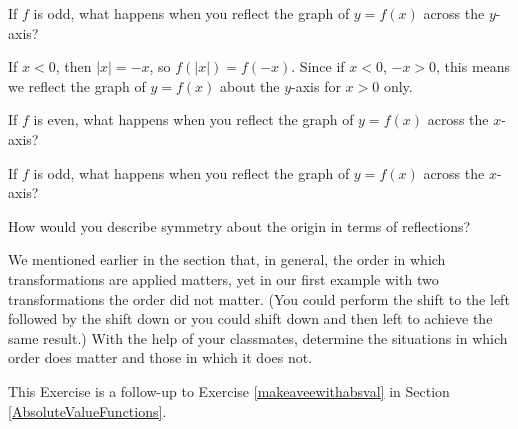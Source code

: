 \documentclass{ximera}
\begin{document}
\begin{question}
If $f$ is odd, what happens when you reflect the graph of $y = f(x)$ across the $y$-axis?
\begin{solution}
If $x < 0$, then $|x| = -x$, so $f(|x|) = f(-x)$.  Since if $x < 0$, $-x > 0$,  this  means we reflect the graph of $y=f(x)$ about the $y$-axis for $x>0$ only.
\end{solution}

\end{question}

\begin{question}
If $f$ is even, what happens when you reflect the graph of $y = f(x)$ across the $x$-axis?
\end{question}

\begin{question}
If $f$ is odd, what happens when you reflect the graph of $y = f(x)$ across the $x$-axis?
\end{question}

\begin{question}
How would you describe symmetry about the origin in terms of reflections?
\end{question}

\begin{question}
We mentioned earlier in the section that, in general, the order in which transformations are applied matters, yet in our first example with two transformations the order did not matter. (You could perform the shift to the left followed by the shift down or you could shift down and then left to achieve the same result.)  With the help of your classmates, determine the situations in which order does matter and those in which it does not.
\end{question}

\begin{question}
This Exercise is a follow-up to Exercise \ref{makeaveewithabsval} in Section \ref{AbsoluteValueFunctions}.

\end{question}
\end{document}
